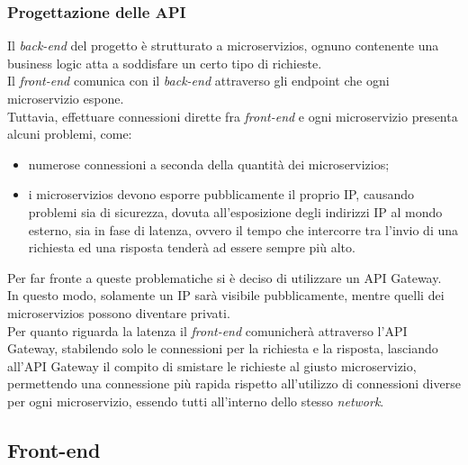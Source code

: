 \subsubsection{Progettazione delle API}
Il \textit{back-end} del progetto è strutturato a \glspl{microservizio}, ognuno contenente una business logic atta a soddisfare un certo tipo di richieste.\\
Il \textit{front-end} comunica con il \textit{back-end} attraverso gli \gls{endpoint} che ogni \gls{microservizio} espone. \\
Tuttavia, effettuare connessioni dirette fra \textit{front-end} e ogni \gls{microservizio} presenta alcuni problemi, come: 
\begin{itemize}
    \item numerose connessioni a seconda della quantità dei \glspl{microservizio};
    \item i \glspl{microservizio} devono esporre pubblicamente il proprio \gls{IP}, causando problemi sia di sicurezza, dovuta all'esposizione degli indirizzi IP al mondo esterno, sia in fase di latenza, ovvero il tempo che intercorre tra l'invio di una richiesta ed una risposta tenderà ad essere
    sempre più alto.
\end{itemize}

\noindent Per far fronte a queste problematiche si è deciso di utilizzare un \gls{API Gateway}.\\
In questo modo, solamente un \gls{IP} sarà visibile pubblicamente, mentre quelli dei \glspl{microservizio} possono diventare privati.\\
Per quanto riguarda la latenza il \textit{front-end} comunicherà attraverso l'\gls{API Gateway}, stabilendo solo le connessioni per la richiesta e la risposta, lasciando all'\gls{API Gateway} il compito di smistare le richieste al giusto \gls{microservizio}, permettendo una connessione più rapida rispetto  all'utilizzo di connessioni diverse per ogni \gls{microservizio}, essendo tutti all'interno dello stesso \textit{network}.

\subsection{Front-end}
